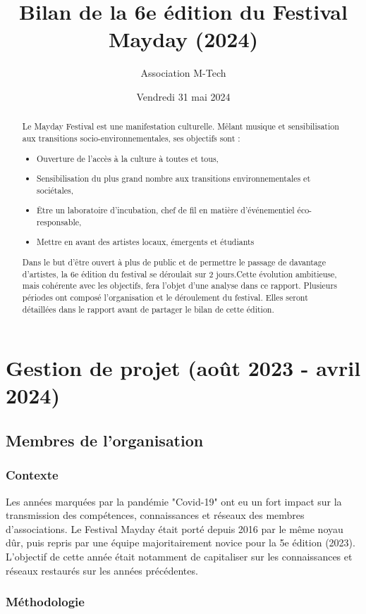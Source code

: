 \documentclass[12pt,a4paper]{report}
\title{Bilan de la 6e édition du Festival Mayday (2024)}
\author{Association M-Tech}
\date{Vendredi 31 mai 2024}
\begin{document}
\maketitle

\begin{abstract}
Le Mayday Festival est une manifestation culturelle. Mêlant musique et sensibilisation aux transitions socio-environnementales, ses objectifs sont :
\begin{itemize}
\item Ouverture de l'accès à la culture à toutes et tous,
\item Sensibilisation du plus grand nombre aux transitions environnementales et sociétales,
\item Être un laboratoire d'incubation, chef de fil en matière d'événementiel éco-responsable,
\item Mettre en avant des artistes locaux, émergents et étudiants
\end{itemize}
Dans le but d'être ouvert à plus de public et de permettre le passage de davantage d'artistes, la 6e édition du festival se déroulait sur 2 jours.Cette évolution ambitieuse, mais cohérente avec les objectifs, fera l'objet d'une analyse dans ce rapport.
Plusieurs périodes ont composé l'organisation et le déroulement du festival. Elles seront détaillées dans le rapport avant de partager le bilan de cette édition.
\end{abstract}

\part{Gestion de projet (août 2023 - avril 2024)}
\chapter{Membres de l'organisation}
\section{Contexte}
Les années marquées par la pandémie "Covid-19" ont eu un fort impact sur la transmission des compétences, connaissances et réseaux des membres d'associations. Le Festival Mayday était porté depuis 2016 par le même noyau dûr, puis repris par une équipe majoritairement novice pour la 5e édition (2023). L'objectif de cette année était notamment de capitaliser sur les connaissances et réseaux restaurés sur les années précédentes. 

\section{Méthodologie}
\end{document}
